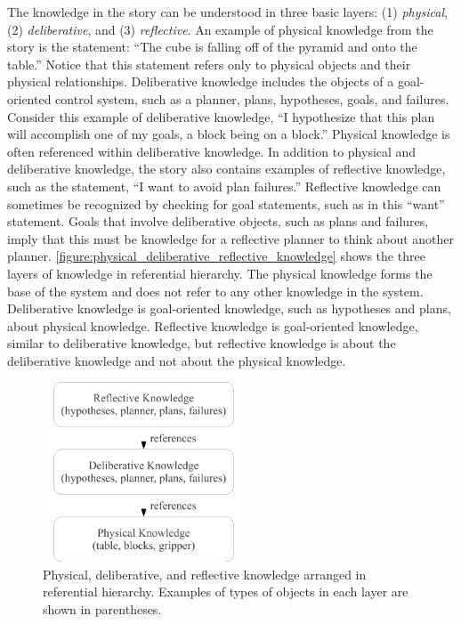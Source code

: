 The knowledge in the story can be understood in three basic layers:
(1) {\emph{physical}}, (2) {\emph{deliberative}}, and (3)
{\emph{reflective}}.  An example of physical knowledge from the story
is the statement: ``The cube is falling off of the pyramid and onto
the table.''  Notice that this statement refers only to physical
objects and their physical relationships.  Deliberative knowledge
includes the objects of a goal-oriented control system, such as a
planner, plans, hypotheses, goals, and failures.  Consider this
example of deliberative knowledge, ``I hypothesize that this plan will
accomplish one of my goals, a block being on a block.''  Physical
knowledge is often referenced within deliberative knowledge.  In
addition to physical and deliberative knowledge, the story also
contains examples of reflective knowledge, such as the statement, ``I
want to avoid plan failures.''  Reflective knowledge can sometimes be
recognized by checking for goal statements, such as in this ``want''
statement.  Goals that involve deliberative objects, such as plans and
failures, imply that this must be knowledge for a reflective planner
to think about another planner.
{\autoref{figure:physical_deliberative_reflective_knowledge}} shows
the three layers of knowledge in referential hierarchy.  The physical
knowledge forms the base of the system and does not refer to any other
knowledge in the system.  Deliberative knowledge is goal-oriented
knowledge, such as hypotheses and plans, about physical knowledge.
Reflective knowledge is goal-oriented knowledge, similar to
deliberative knowledge, but reflective knowledge is about the
deliberative knowledge and not about the physical knowledge.
\begin{figure}
  \center
  \includegraphics[width=6cm]{gfx/physical_deliberative_reflective_knowledge}
  \caption{Physical, deliberative, and reflective knowledge arranged
    in referential hierarchy.  Examples of types of objects in each
    layer are shown in parentheses.}
  \label{figure:physical_deliberative_reflective_knowledge}
\end{figure}

